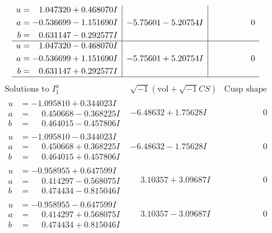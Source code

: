 \documentclass[1p]{elsarticle_modified}
\theoremstyle{definition}
\newcommand{\I}{\sqrt{-1}}
\begin{document}
$$\begin{array}{c|c|c}
\begin{aligned}
u &= \phantom{-}1.047320 + 0.468070 I \\
a &= -0.536699 - 1.151690 I \\
b &= \phantom{-}0.631147 - 0.292577 I\end{aligned}
 & -5.75601 - 5.20754 I & \phantom{-0.000000 } 0 \\ \hline\begin{aligned}
u &= \phantom{-}1.047320 - 0.468070 I \\
a &= -0.536699 + 1.151690 I \\
b &= \phantom{-}0.631147 + 0.292577 I\end{aligned}
 & -5.75601 + 5.20754 I & \phantom{-0.000000 } 0\\
 \hline 
 \end{array}$$\newpage$$\begin{array}{c|c|c}  
\text{Solutions to }I^u_{1}& \I (\text{vol} + \sqrt{-1}CS) & \text{Cusp shape}\\
 \hline 
\begin{aligned}
u &= -1.095810 + 0.344023 I \\
a &= \phantom{-}0.450668 - 0.368225 I \\
b &= \phantom{-}0.464015 - 0.457806 I\end{aligned}
 & -6.48632 + 1.75628 I & \phantom{-0.000000 } 0 \\ \hline\begin{aligned}
u &= -1.095810 - 0.344023 I \\
a &= \phantom{-}0.450668 + 0.368225 I \\
b &= \phantom{-}0.464015 + 0.457806 I\end{aligned}
 & -6.48632 - 1.75628 I & \phantom{-0.000000 } 0 \\ \hline\begin{aligned}
u &= -0.958955 + 0.647599 I \\
a &= \phantom{-}0.414297 - 0.568075 I \\
b &= \phantom{-}0.474434 - 0.815046 I\end{aligned}
 & \phantom{-}3.10357 + 3.09687 I & \phantom{-0.000000 } 0 \\ \hline\begin{aligned}
u &= -0.958955 - 0.647599 I \\
a &= \phantom{-}0.414297 + 0.568075 I \\
b &= \phantom{-}0.474434 + 0.815046 I\end{aligned}
 & \phantom{-}3.10357 - 3.09687 I & \phantom{-0.000000 } 0 \\ \hline\begin{aligned}

\end{aligned}
\end{array}$$
\end{document}
